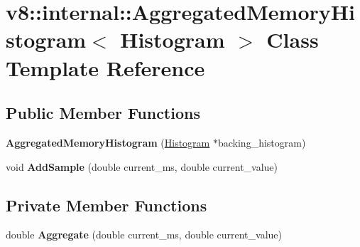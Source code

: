\hypertarget{classv8_1_1internal_1_1_aggregated_memory_histogram}{}\section{v8\+:\+:internal\+:\+:Aggregated\+Memory\+Histogram$<$ Histogram $>$ Class Template Reference}
\label{classv8_1_1internal_1_1_aggregated_memory_histogram}
\subsection*{Public Member Functions}
\begin{DoxyCompactItemize}
\item 
{\bfseries Aggregated\+Memory\+Histogram} (\hyperlink{classv8_1_1internal_1_1_histogram}{Histogram} $\ast$backing\+\_\+histogram)\hypertarget{classv8_1_1internal_1_1_aggregated_memory_histogram_a8b49cfff760e104f1150397b4a774806}{}\label{classv8_1_1internal_1_1_aggregated_memory_histogram_a8b49cfff760e104f1150397b4a774806}

\item 
void {\bfseries Add\+Sample} (double current\+\_\+ms, double current\+\_\+value)\hypertarget{classv8_1_1internal_1_1_aggregated_memory_histogram_afed07b5cc00d1e8f58be83d85ea6fe94}{}\label{classv8_1_1internal_1_1_aggregated_memory_histogram_afed07b5cc00d1e8f58be83d85ea6fe94}

\end{DoxyCompactItemize}
\subsection*{Private Member Functions}
\begin{DoxyCompactItemize}
\item 
double {\bfseries Aggregate} (double current\+\_\+ms, double current\+\_\+value)\hypertarget{classv8_1_1internal_1_1_aggregated_memory_histogram_a650db63f122dec851284bfe8bcf5c384}{}\label{classv8_1_1internal_1_1_aggregated_memory_histogram_a650db63f122dec851284bfe8bcf5c384}

\end{DoxyCompactItemize}
